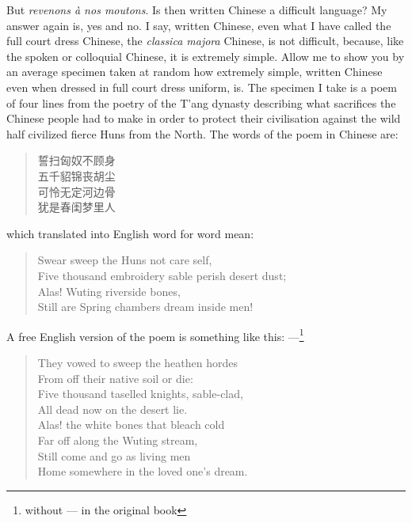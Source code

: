 But \emph{revenons \`a nos moutons}.  
Is then written Chinese a difficult language?
My answer again is, yes and no.
I say, written Chinese, even what I have called the full court dress Chinese, the \emph{classica majora} Chinese, is not difficult, because, like the spoken or colloquial Chinese, it is extremely simple.
Allow me to show you by an average specimen taken at random how extremely simple, written Chinese even when dressed in full court dress uniform, is.
The specimen I take is a poem of four lines from the poetry of the T'ang dynasty  describing what sacrifices the Chinese people had to make in order to protect their civilisation against the wild half civilized fierce Huns  from the North.
The words of the poem in Chinese are:
\begin{quote}\footnotesize
    誓扫匈奴不顾身 \\
    五千貂锦丧胡尘 \\
    可怜无定河边骨 \\
    犹是春闺梦里人 \\
\end{quote}
which translated into English word for word mean:
\begin{quote}\footnotesize
    Swear sweep the Huns not care self, \\
    Five thousand embroidery sable perish desert dust; \\
    Alas! Wuting riverside bones, \\
    Still are Spring chambers dream inside men!
\end{quote}
A free English version of the poem is something like this: ---\footnote{without --- in the original book}
\begin{quote}\footnotesize
    They vowed to sweep the heathen hordes \\
    From off their native soil or die: \\
    Five thousand taselled knights, sable-clad, \\
    All dead now on the desert lie. \\
    Alas! the white bones that bleach cold \\
    Far off along the Wuting stream, \\
    Still come and go as living men \\
    Home somewhere in the loved one's dream.
\end{quote}


